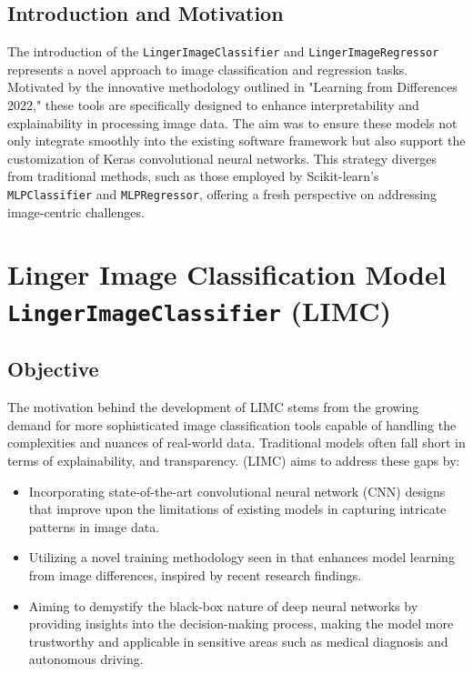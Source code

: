 \documentclass[a4paper, 12pt]{report}
\begin{document}
\subsection{Introduction and Motivation}
The introduction of the \texttt{LingerImageClassifier} and \texttt{LingerImageRegressor} represents a novel approach 
to image classification and regression tasks. Motivated by the innovative methodology outlined in "Learning from Differences 2022," 
these tools are specifically designed to enhance interpretability and explainability in processing image data. 
The aim was to ensure these models not only integrate smoothly into the existing software framework but also support the customization of Keras 
convolutional neural networks. This strategy diverges from traditional methods, such as those employed by Scikit-learn's \texttt{MLPClassifier} and 
\texttt{MLPRegressor}, offering a fresh perspective on addressing image-centric challenges.

\section{Linger Image Classification Model \texttt{LingerImageClassifier} (LIMC)}
\label{sec:lingerImage_Classifier_model}
\subsection{Objective}
The motivation behind the development of LIMC stems from the growing demand for more sophisticated image classification tools capable of handling 
the complexities and nuances of real-world data. Traditional models often fall short in terms of explainability, and transparency. 
(LIMC) aims to address these gaps by:

\begin{itemize}
    \item Incorporating state-of-the-art convolutional neural network (CNN) designs that improve upon the limitations of existing models in capturing intricate patterns in image data.
    \item Utilizing a novel training methodology seen in \cite{learningFromDifferences2022} that enhances model learning from image differences, inspired by recent research findings.
    \item Aiming to demystify the black-box nature of deep neural networks by providing insights into the decision-making process, making the model more trustworthy and applicable in sensitive 
    areas such as medical diagnosis and autonomous driving.
\end{itemize}
\end{document}
